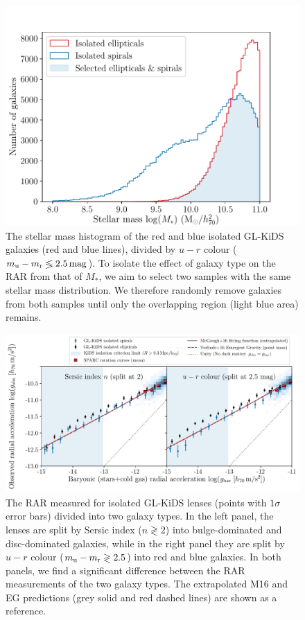 \documentclass[usenatbib]{mnras}
\newcommand{\magn}{\, {\rm mag} }
\newcommand{\un}[1]{_{\rm #1}}
\begin{document}
\begin{figure}
	\includegraphics[width=\columnwidth]{Figures/mass_range_selection_offsetx0.pdf}
	\caption{The stellar mass histogram of the red and blue isolated GL-KiDS galaxies (red and blue lines), divided by $u-r$ colour ($m\un{u} - m\un{r} \lessgtr 2.5 \magn$). To isolate the effect of galaxy type on the RAR from that of $M_*$, we aim to select two samples with the same stellar mass distribution. We therefore randomly remove galaxies from both samples until only the overlapping region (light blue area) remains.}
	\label{fig:galtypes_masshist}
\end{figure}


\begin{figure}
	\includegraphics[width=\textwidth]{Figures/RAR_KiDS_galtypes_isolated_samemass.pdf}
	\caption{The RAR measured for isolated GL-KiDS lenses (points with $1\sigma$ error bars) divided into two galaxy types. In the left panel, the lenses are split by Sersic index ($n\gtrless2$) into bulge-dominated and disc-dominated galaxies, while in the right panel they are split by $u-r$ colour ($m\un{u} - m\un{r} \gtrless 2.5$) into red and blue galaxies. In both panels, we find a significant difference between the RAR measurements of the two galaxy types. The extrapolated M16 and EG predictions (grey solid and red dashed lines) are shown as a reference.}
	\label{fig:RAR_kids_galtypebins}
\end{figure}
\end{document}
